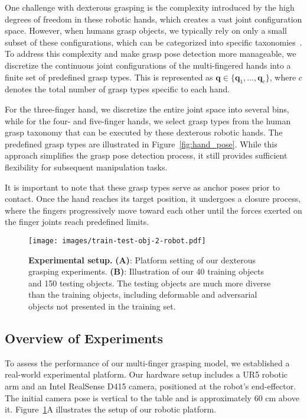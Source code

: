 One challenge with dexterous grasping is the complexity introduced by the high degrees of freedom in these robotic hands, which creates a vast joint configuration space. However, when humans grasp objects, we typically rely on only a small subset of these configurations, which can be categorized into specific taxonomies~\cite{cutkosky1989grasp,feix2015grasp}. To address this complexity and make grasp pose detection more manageable, we discretize the continuous joint configurations of the multi-fingered hands into a finite set of predefined grasp types. This is represented as $\mathbf{q} \in \{\mathbf{q}_1, ..., \mathbf{q}_c\}$, where $c$ denotes the total number of grasp types specific to each hand.

For the three-finger hand, we discretize the entire joint space into several bins, while for the four- and five-finger hands, we select grasp types from the human grasp taxonomy that can be executed by these dexterous robotic hands. The predefined grasp types are illustrated in Figure~\ref{fig:hand_pose}. While this approach simplifies the grasp pose detection process, it still provides sufficient flexibility for subsequent manipulation tasks.

It is important to note that these grasp types serve as anchor poses prior to contact. Once the hand reaches its target position, it undergoes a closure process, where the fingers progressively move toward each other until the forces exerted on the finger joints reach predefined limits.


\begin{figure}[t]
    \centering
    \texttt{[image: images/train-test-obj-2-robot.pdf]}
    \caption{\textbf{Experimental setup.} \textbf{(A)}: Platform setting of our dexterous grasping experiments. \textbf{(B)}: Illustration of our 40 training objects and 150 testing objects. The testing objects are much more diverse than the training objects, including deformable and adversarial objects not presented in the training set.}
    \label{fig:objects}
\end{figure}

\subsection{Overview of Experiments}
To assess the performance of our multi-finger grasping model, we established a real-world experimental platform. Our hardware setup includes a UR5 robotic arm and an Intel RealSense D415 camera, positioned at the robot's end-effector. The initial camera pose is vertical to the table and is approximately 60 cm above it. Figure~\ref{fig:objects}A illustrates the setup of our robotic platform.

